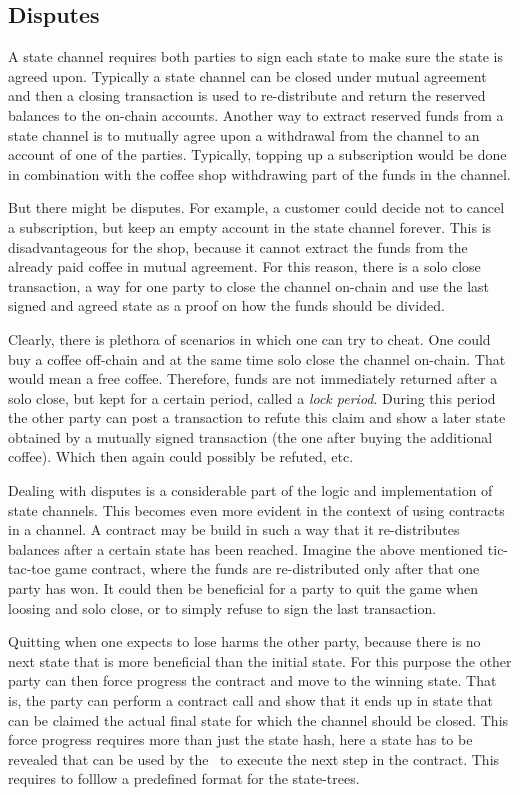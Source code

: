 \subsection{Disputes}

A state channel requires both parties to sign each state to make
sure the state is agreed upon. Typically a state channel can be closed
under mutual agreement and then a closing transaction is used to
re-distribute and return the reserved balances to the on-chain
accounts. Another way to extract reserved funds from a state channel
is to mutually agree upon a withdrawal from the channel to an account of
one of the parties. Typically, topping up a subscription would be done
in combination with the coffee shop withdrawing part of the funds in
the channel.

But there might be disputes. For example, a customer
could decide not to cancel a subscription, but keep an empty account
in the state channel forever. This is disadvantageous for the shop,
because it cannot extract the funds from the already paid coffee in
mutual agreement. For this reason, there is a solo close transaction,
a way for one party to close the channel on-chain and use the last
signed and agreed state as a proof on how the funds should be divided.

Clearly, there is plethora of scenarios in which one can try to
cheat. One could buy a coffee off-chain and at the same time solo
close the channel on-chain. That would mean a free coffee. Therefore,
funds are not immediately returned after a solo close, but kept for a
certain period, called a \textit{lock period}. During this period the
other party can post a transaction to refute this claim and show a
later state obtained by a mutually signed transaction (the one after
buying the additional coffee). Which then again could possibly be
refuted, etc.

Dealing with disputes is a considerable part of the logic and
implementation of state channels. This becomes even more evident in
the context of using contracts in a channel. A contract may be build
in such a way that it re-distributes balances after a certain state has
been reached. Imagine the above mentioned tic-tac-toe game contract,
where the funds are re-distributed only after that one party has
won. It could then be beneficial for a party to quit the
game when loosing and solo close, or to simply refuse to sign the last
transaction.

Quitting when one expects to lose
harms the other party, because there is no next state that is more
beneficial than the initial state. For this purpose the other party
can then force progress the contract and move to the winning
state. That is, the party can perform a contract call and show that it
ends up in state that can be claimed the actual final state for which
the channel should be closed. This force progress requires more than
just the state hash, here a state has to be revealed that can be used
by the \blockchain\ to execute the next step in the
contract. This requires to folllow a predefined format for the state-trees.


